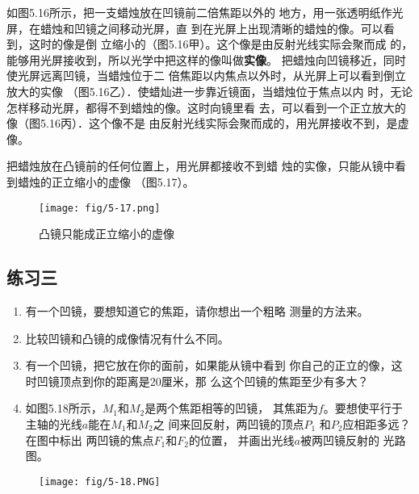 如图5.16所示，把一支蜡烛放在凹镜前二倍焦距以外的
地方，用一张透明纸作光屏，在蜡烛和凹镜之间移动光屏，直
到在光屏上出现清晰的蜡烛的像。可以看到，这时的像是倒
立缩小的（图5.16甲）。这个像是由反射光线实际会聚而成
的，能够用光屏接收到，所以光学中把这样的像叫做\textbf{实像}。
把蜡烛向凹镜移近，同时使光屏远离凹镜，当蜡烛位于二
倍焦距以内焦点以外时，从光屏上可以看到倒立放大的实像
（图5.16乙）．使蜡灿进一步靠近镜面，当蜡烛位于焦点以内
时，无论怎样移动光屏，都得不到蜡烛的像。这时向镜里看
去，可以看到一个正立放大的像（图5.16丙）．这个像不是
由反射光线实际会聚而成的，用光屏接收不到，是虚像。

把蜡烛放在凸镜前的任何位置上，用光屏都接收不到蜡
烛的实像，只能从镜中看到蜡烛的正立缩小的虚像
（图5.17）。
   \begin{figure}[htp]\centering
        \texttt{[image: fig/5-17.png]}
        \caption{凸镜只能成正立缩小的虚像}
        \end{figure}

\subsection*{练习三}
\begin{enumerate}
    \item 有一个凹镜，要想知道它的焦距，请你想出一个粗略
        测量的方法来。
    \item 比较凹镜和凸镜的成像情况有什么不同。
    \item 有一个凹镜，把它放在你的面前，如果能从镜中看到
        你自己的正立的像，这时凹镜顶点到你的距离是20厘米，那
        么这个凹镜的焦距至少有多大？
    \item 如图5.18所示，$M_1$和$M_2$是两个焦距相等的凹镜，
    其焦距为$f$。要想使平行于主轴的光线$a$能在$M_1$和$M_2$之
    间来回反射，两凹镜的顶点$P_1$
    和$P_2$应相距多远？在图中标出
    两凹镜的焦点$F_1$和$F_2$的位置，
    并画出光线$a$被两凹镜反射的
    光路图。
\end{enumerate}

\begin{figure}[htp]\centering
    \texttt{[image: fig/5-18.PNG]}
    \caption{}
    \end{figure}
 
